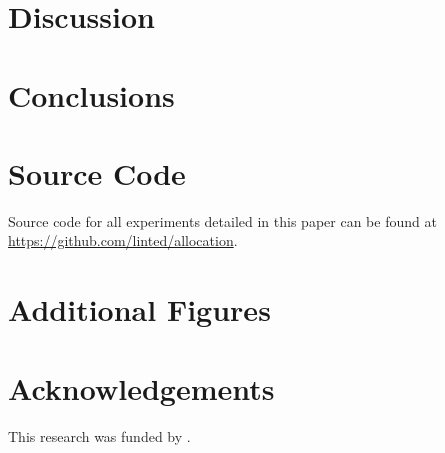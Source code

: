\documentclass[letterpaper, 10 pt, conference]{ieeeconf}  %
\newcommand*\GitHubLoc{https://github.com/linted/allocation}
\begin{document}
\section{Discussion}


\section{Conclusions}

\section{Source Code}

Source code for all experiments detailed in this paper can be found at \url{\GitHubLoc}.

\section{Additional Figures}


\section{Acknowledgements}

\noindent This research was funded by .

\clearpage
\end{document}
